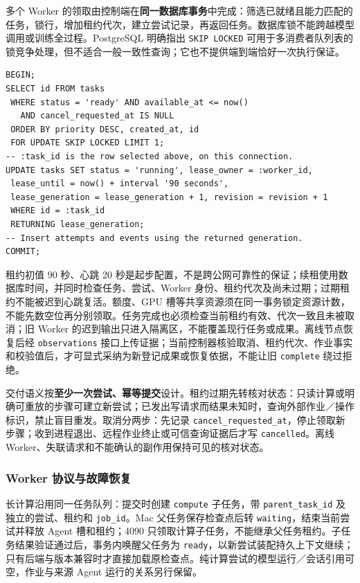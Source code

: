 \documentclass[11pt,a4paper]{article}
\begin{document}
多个 Worker 的领取由控制端在\textbf{同一数据库事务}中完成：筛选已就绪且能力匹配的任务，锁行，增加租约代次，建立尝试记录，再返回任务。数据库锁不能跨越模型调用或训练全过程。PostgreSQL 明确指出 \texttt{SKIP LOCKED} 可用于多消费者队列表的锁竞争处理，但不适合一般一致性查询；它也不提供端到端恰好一次执行保证。\cite{rdRuntimePg}

\par\noindent\begin{minipage}{\linewidth}
\begin{lstlisting}[caption={领取事务的关键 SQL；省略已校验的能力与配额条件}]
BEGIN;
SELECT id FROM tasks
 WHERE status = 'ready' AND available_at <= now()
   AND cancel_requested_at IS NULL
 ORDER BY priority DESC, created_at, id
 FOR UPDATE SKIP LOCKED LIMIT 1;
-- :task_id is the row selected above, on this connection.
UPDATE tasks SET status = 'running', lease_owner = :worker_id,
 lease_until = now() + interval '90 seconds',
 lease_generation = lease_generation + 1, revision = revision + 1
 WHERE id = :task_id
 RETURNING lease_generation;
-- Insert attempts and events using the returned generation.
COMMIT;
\end{lstlisting}
\end{minipage}\par


租约初值 90 秒、心跳 20 秒是起步配置，不是跨公网可靠性的保证；续租使用数据库时间，并同时检查任务、尝试、Worker 身份、租约代次及尚未过期；过期租约不能被迟到心跳复活。额度、GPU 槽等共享资源须在同一事务锁定资源计数，不能先数空位再分别领取。任务完成也必须检查当前租约有效、代次一致且未被取消；旧 Worker 的迟到输出只进入隔离区，不能覆盖现行任务或成果。离线节点恢复后经 \texttt{observations} 接口上传证据；当前控制器核验取消、租约代次、作业事实和校验值后，才可显式采纳为新登记成果或恢复依据，不能让旧 \texttt{complete} 绕过拒绝。

交付语义按\textbf{至少一次尝试、幂等提交}设计。租约过期先转核对状态：只读计算或明确可重放的步骤可建立新尝试；已发出写请求而结果未知时，查询外部作业／操作标识，禁止盲目重发。取消分两步：先记录 \texttt{cancel\_requested\_at}，停止领取新步骤；收到进程退出、远程作业终止或可信查询证据后才写 \texttt{cancelled}。离线 Worker、失联请求和不能确认的副作用保持可见的核对状态。

\subsubsection{Worker 协议与故障恢复}

长计算沿用同一任务队列：提交时创建 \texttt{compute} 子任务，带 \texttt{parent\_task\_id} 及独立的尝试、租约和 \texttt{job\_id}。Mac 父任务保存检查点后转 \texttt{waiting}，结束当前尝试并释放 Agent 槽和租约；4090 只领取计算子任务，不能继承父任务租约。子任务结果验证通过后，事务内唤醒父任务为 \texttt{ready}，以新尝试装配持久上下文继续；只有后端与版本兼容时才直接加载原检查点。纯计算尝试的模型运行／会话引用可空，作业与来源 Agent 运行的关系另行保留。
\end{document}

